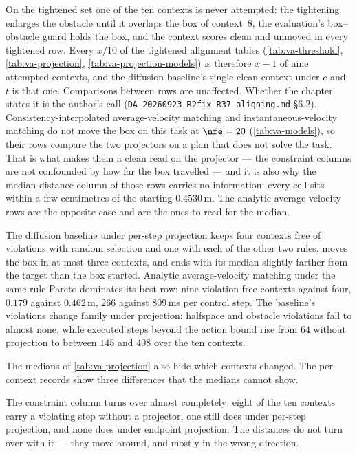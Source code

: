 On the tightened set one of the ten contexts is never attempted: the tightening enlarges the
obstacle until it overlaps the box of context~8, the evaluation's box--obstacle guard holds the box, and
the context scores clean and unmoved in every tightened row. Every $x/10$ of the tightened alignment tables
(\autoref{tab:va-threshold}, \autoref{tab:va-projection}, \autoref{tab:va-projection-models}) is therefore
$x-1$ of nine attempted contexts, and the diffusion baseline's single clean context under $c$ and $t$ is
that one. Comparisons between rows are unaffected. Whether the chapter states it is the author's call
(\texttt{DA\_20260923\_R2fix\_R37\_aligning.md} \S6.2).
Consistency-interpolated average-velocity matching and instantaneous-velocity matching do not
move the box on this task at $\nfe=20$ (\autoref{tab:va-models}), so their rows compare the two
projectors on a plan that does not solve the task. That is what makes them a clean read on the
projector --- the constraint columns are not confounded by how far the box travelled --- and it is also
why the median-distance column of those rows carries no information: every cell sits within a few
centimetres of the starting $0.4530$\,m. The analytic average-velocity rows are the opposite case and are
the ones to read for the median.

The diffusion baseline under per-step projection keeps four contexts free of violations with random
selection and one with each of the other two rules, moves the box in at most three contexts, and ends with
its median slightly farther from the target than the box started. Analytic average-velocity matching under
the same rule Pareto-dominates its best row: nine violation-free contexts against four, $0.179$ against $0.462$\,m,
$266$ against $809$\,ms per control step. The baseline's violations change family under projection:
halfspace and obstacle violations fall to almost none, while executed steps beyond the action bound rise
from $64$ without projection to between $145$ and $408$ over the ten contexts.

The medians of \autoref{tab:va-projection} also hide which contexts changed. The per-context records
show three differences that the medians cannot show.

The constraint column turns over almost completely: eight of the ten contexts carry a violating step
without a projector, one still does under per-step projection, and none does under endpoint projection.
The distances do not turn over with it --- they move around, and mostly in the wrong direction.

